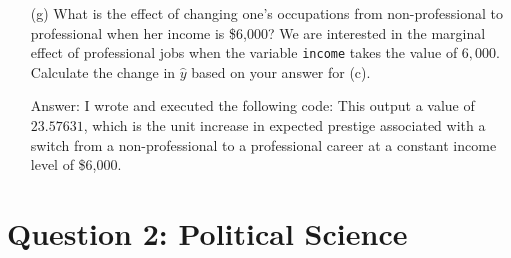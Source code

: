 \documentclass[12pt,letterpaper]{article}
\begin{document}
\begin{enumerate}
	\item [(g)]
	What is the effect of changing one's occupations from non-professional to professional when her income is \$6,000? We are interested in the marginal effect of professional jobs when the variable \texttt{income} takes the value of $6,000$. Calculate the change in $\hat{y}$ based on your answer for (c).
	\vspace{.25cm}
	
	\item [Answer:]
	I wrote and executed the following code:  This output a value of $23.57631$, which is the unit increase in expected prestige associated with a switch from a non-professional to a professional career at a constant income level of \$6,000.
	\vspace{1cm}
	
	
\end{enumerate}

\newpage

\section*{Question 2: Political Science}
\vspace{.25cm}
\end{document}
